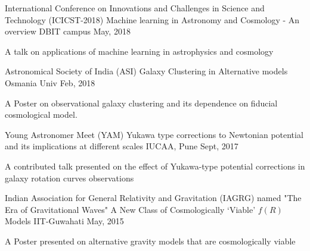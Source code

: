 

\begin{cventries}
	
\cventry
{International Conference on Innovations and Challenges in Science and Technology (ICICST-2018)} %
{Machine learning in Astronomy and Cosmology - An overview} %
{DBIT campus} %
{May, 2018} %
{
	\begin{cvitems} %
		\item {A talk on applications of machine learning in astrophysics and cosmology}
	\end{cvitems}		
}

\cventry
{Astronomical Society of India (ASI)} %
{Galaxy Clustering in Alternative models} %
{Osmania Univ} %
{Feb, 2018} %
{
	\begin{cvitems} %
		\item {A Poster on observational galaxy clustering and its dependence on fiducial cosmological model.}
	\end{cvitems}		
}


\cventry
{Young Astronomer Meet (YAM)} %
{Yukawa type corrections to Newtonian potential and its implications at different scales} %
{IUCAA, Pune} %
{Sept, 2017} %
{
	\begin{cvitems} %
		\item {A contributed talk presented on the effect of Yukawa-type potential corrections in galaxy rotation curves observations}
	\end{cvitems}		
}

\cventry
{Indian Association for General Relativity and Gravitation (IAGRG) named "The Era of Gravitational Waves"} %
{A New Class of Cosmologically `Viable' $f(R)$ Models} %
{IIT-Guwahati} %
{May, 2015} %
{
	\begin{cvitems} %
		\item {A Poster presented on alternative gravity models that are cosmologically viable}
	\end{cvitems}		
}



\end{cventries}
